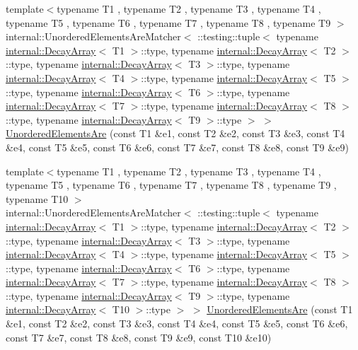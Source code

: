 \begin{DoxyCompactItemize}
\item 
{\footnotesize template$<$typename T1 , typename T2 , typename T3 , typename T4 , typename T5 , typename T6 , typename T7 , typename T8 , typename T9 $>$ }\\internal\+::\+Unordered\+Elements\+Are\+Matcher$<$ \+::testing\+::tuple$<$ typename \mbox{\hyperlink{structtesting_1_1internal_1_1DecayArray}{internal\+::\+Decay\+Array}}$<$ T1 $>$\+::type, typename \mbox{\hyperlink{structtesting_1_1internal_1_1DecayArray}{internal\+::\+Decay\+Array}}$<$ T2 $>$\+::type, typename \mbox{\hyperlink{structtesting_1_1internal_1_1DecayArray}{internal\+::\+Decay\+Array}}$<$ T3 $>$\+::type, typename \mbox{\hyperlink{structtesting_1_1internal_1_1DecayArray}{internal\+::\+Decay\+Array}}$<$ T4 $>$\+::type, typename \mbox{\hyperlink{structtesting_1_1internal_1_1DecayArray}{internal\+::\+Decay\+Array}}$<$ T5 $>$\+::type, typename \mbox{\hyperlink{structtesting_1_1internal_1_1DecayArray}{internal\+::\+Decay\+Array}}$<$ T6 $>$\+::type, typename \mbox{\hyperlink{structtesting_1_1internal_1_1DecayArray}{internal\+::\+Decay\+Array}}$<$ T7 $>$\+::type, typename \mbox{\hyperlink{structtesting_1_1internal_1_1DecayArray}{internal\+::\+Decay\+Array}}$<$ T8 $>$\+::type, typename \mbox{\hyperlink{structtesting_1_1internal_1_1DecayArray}{internal\+::\+Decay\+Array}}$<$ T9 $>$\+::type $>$ $>$ \mbox{\hyperlink{namespacetesting_a2e03e363e193ef512bf9fa964c484375}{Unordered\+Elements\+Are}} (const T1 \&e1, const T2 \&e2, const T3 \&e3, const T4 \&e4, const T5 \&e5, const T6 \&e6, const T7 \&e7, const T8 \&e8, const T9 \&e9)
\item 
{\footnotesize template$<$typename T1 , typename T2 , typename T3 , typename T4 , typename T5 , typename T6 , typename T7 , typename T8 , typename T9 , typename T10 $>$ }\\internal\+::\+Unordered\+Elements\+Are\+Matcher$<$ \+::testing\+::tuple$<$ typename \mbox{\hyperlink{structtesting_1_1internal_1_1DecayArray}{internal\+::\+Decay\+Array}}$<$ T1 $>$\+::type, typename \mbox{\hyperlink{structtesting_1_1internal_1_1DecayArray}{internal\+::\+Decay\+Array}}$<$ T2 $>$\+::type, typename \mbox{\hyperlink{structtesting_1_1internal_1_1DecayArray}{internal\+::\+Decay\+Array}}$<$ T3 $>$\+::type, typename \mbox{\hyperlink{structtesting_1_1internal_1_1DecayArray}{internal\+::\+Decay\+Array}}$<$ T4 $>$\+::type, typename \mbox{\hyperlink{structtesting_1_1internal_1_1DecayArray}{internal\+::\+Decay\+Array}}$<$ T5 $>$\+::type, typename \mbox{\hyperlink{structtesting_1_1internal_1_1DecayArray}{internal\+::\+Decay\+Array}}$<$ T6 $>$\+::type, typename \mbox{\hyperlink{structtesting_1_1internal_1_1DecayArray}{internal\+::\+Decay\+Array}}$<$ T7 $>$\+::type, typename \mbox{\hyperlink{structtesting_1_1internal_1_1DecayArray}{internal\+::\+Decay\+Array}}$<$ T8 $>$\+::type, typename \mbox{\hyperlink{structtesting_1_1internal_1_1DecayArray}{internal\+::\+Decay\+Array}}$<$ T9 $>$\+::type, typename \mbox{\hyperlink{structtesting_1_1internal_1_1DecayArray}{internal\+::\+Decay\+Array}}$<$ T10 $>$\+::type $>$ $>$ \mbox{\hyperlink{namespacetesting_ae0e6c9754b17623a64358da8d38c4d13}{Unordered\+Elements\+Are}} (const T1 \&e1, const T2 \&e2, const T3 \&e3, const T4 \&e4, const T5 \&e5, const T6 \&e6, const T7 \&e7, const T8 \&e8, const T9 \&e9, const T10 \&e10)

\end{DoxyCompactItemize}
